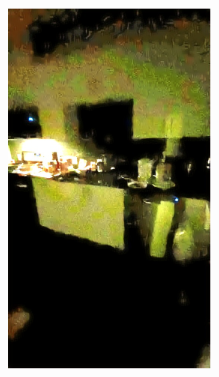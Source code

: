 \documentclass[letterpaper,12pt]{article}
\begin{document}
\begin{figure}[htbp]
\begin{subfigure}{0.128\textwidth}
			\includegraphics[width=\linewidth]{LoLi-Phone-imgT/MBLLEN}
			\captionsetup{font=scriptsize}
			\caption{}
			\label{fig: LoLi-Phone-imgT_e}
		\end{subfigure}
		\begin{subfigure}{0.128\textwidth}

\end{subfigure}
\end{figure}
\end{document}
